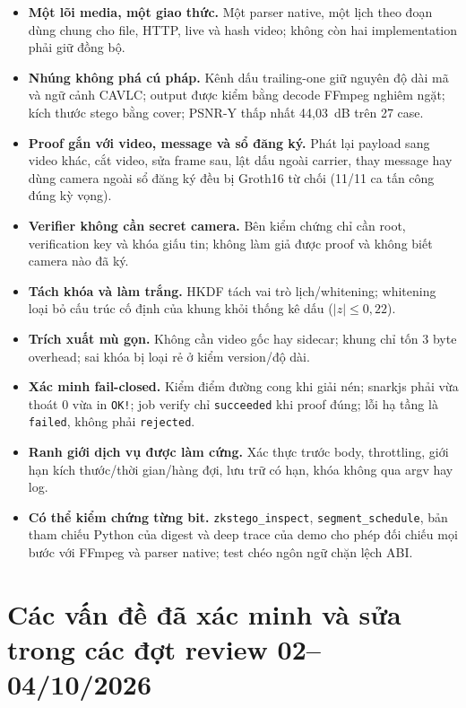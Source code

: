 \documentclass[10pt,a4paper]{article}
\begin{document}
\begin{itemize}
  \item \textbf{Một lõi media, một giao thức.} Một parser native, một lịch theo đoạn dùng chung cho file, HTTP, live và hash video; không còn hai implementation phải giữ đồng bộ.
  \item \textbf{Nhúng không phá cú pháp.} Kênh dấu trailing-one giữ nguyên độ dài mã và ngữ cảnh CAVLC; output được kiểm bằng decode FFmpeg nghiêm ngặt; kích thước stego bằng cover; PSNR-Y thấp nhất 44,03~dB trên 27 case.
  \item \textbf{Proof gắn với video, message và sổ đăng ký.} Phát lại payload sang video khác, cắt video, sửa frame sau, lật dấu ngoài carrier, thay message hay dùng camera ngoài sổ đăng ký đều bị Groth16 từ chối (11/11 ca tấn công đúng kỳ vọng).
  \item \textbf{Verifier không cần secret camera.} Bên kiểm chứng chỉ cần root, verification key và khóa giấu tin; không làm giả được proof và không biết camera nào đã ký.
  \item \textbf{Tách khóa và làm trắng.} HKDF tách vai trò lịch/whitening; whitening loại bỏ cấu trúc cố định của khung khỏi thống kê dấu ($|z|\leq 0{,}22$).
  \item \textbf{Trích xuất mù gọn.} Không cần video gốc hay sidecar; khung chỉ tốn 3 byte overhead; sai khóa bị loại rẻ ở kiểm version/độ dài.
  \item \textbf{Xác minh fail-closed.} Kiểm điểm đường cong khi giải nén; snarkjs phải vừa thoát 0 vừa in \texttt{OK!}; job verify chỉ \texttt{succeeded} khi proof đúng; lỗi hạ tầng là \texttt{failed}, không phải \texttt{rejected}.
  \item \textbf{Ranh giới dịch vụ được làm cứng.} Xác thực trước body, throttling, giới hạn kích thước/thời gian/hàng đợi, lưu trữ có hạn, khóa không qua argv hay log.
  \item \textbf{Có thể kiểm chứng từng bit.} \texttt{zkstego\_inspect}, \texttt{segment\_schedule}, bản tham chiếu Python của digest và deep trace của demo cho phép đối chiếu mọi bước với FFmpeg và parser native; test chéo ngôn ngữ chặn lệch ABI.
\end{itemize}

\section{Các vấn đề đã xác minh và sửa trong các đợt review 02--04/10/2026}\label{sec:fixed}
\end{document}

